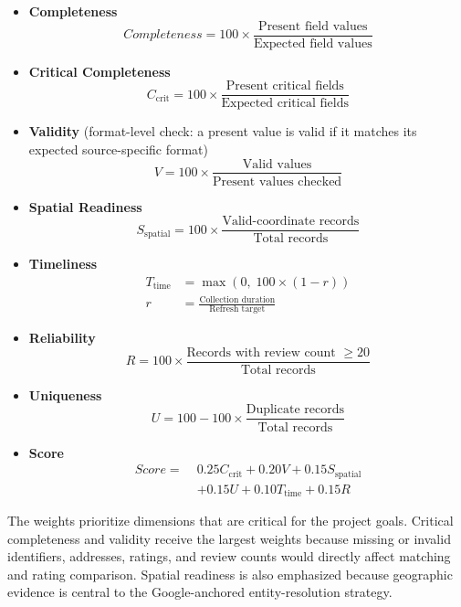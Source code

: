 \begin{itemize}

\item \textbf{Completeness}
\[
Completeness =
100 \times
\frac{\text{Present field values}}
{\text{Expected field values}}
\]

\item \textbf{Critical Completeness}
\[
C_{\mathrm{crit}} =
100 \times
\frac{\text{Present critical fields}}
{\text{Expected critical fields}}
\]

\item \textbf{Validity} (format-level check: a present value is valid if it matches its expected source-specific format)
\[
V =
100 \times
\frac{\text{Valid values}}
{\text{Present values checked}}
\]

\item \textbf{Spatial Readiness}
\[
S_{\mathrm{spatial}} =
100 \times
\frac{\text{Valid-coordinate records}}
{\text{Total records}}
\]

\item \textbf{Timeliness}
\[
\begin{aligned}
T_{\mathrm{time}} &= \max(0,\;100 \times (1 - r))\\
r &= \frac{\text{Collection duration}}{\text{Refresh target}}
\end{aligned}
\]

\item \textbf{Reliability}
\[
R =
100 \times
\frac{\text{Records with review count } \geq 20}
{\text{Total records}}
\]

\item \textbf{Uniqueness}
\[
U =
100 -
100 \times
\frac{\text{Duplicate records}}
{\text{Total records}}
\]

\item \textbf{Score}
\[
\begin{aligned}
Score =\;&
0.25 C_{\mathrm{crit}} + 0.20 V + 0.15 S_{\mathrm{spatial}}\\
&+ 0.15 U + 0.10 T_{\mathrm{time}} + 0.15 R
\end{aligned}
\]

\end{itemize}


The weights prioritize dimensions that are critical for the project goals. Critical completeness and validity receive the largest weights because missing or invalid identifiers, addresses, ratings, and review counts would directly affect matching and rating comparison. Spatial readiness is also emphasized because geographic evidence is central to the Google-anchored entity-resolution strategy.

